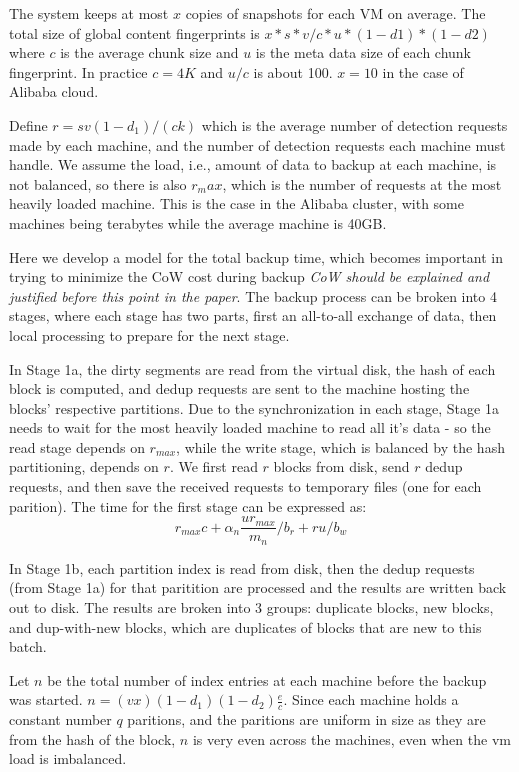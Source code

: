 The system keeps at most  $ x$ copies of snapshots for each VM on average.  The
total size of  global content fingerprints is $x*s*v/c*u *(1-d1)*(1-d2)$ where
$c$ is the average chunk size and $u$ is the meta data size of each chunk
fingerprint. In practice $c=4K$ and $u/c$  is about 100.  $x=10$ in the case of
Alibaba cloud.

Define $r = s v (1-d_1)/(ck)$  which is the average number of detection
requests made by each machine, and the number of detection requests each
machine must handle.  We assume the load, i.e., amount of data to backup at
each machine, is not balanced, so there is also $r_max$, which is the number of
requests at the most heavily loaded machine. This is the case in the Alibaba
cluster, with some machines being terabytes while the average machine is 40GB.

Here we develop a model for the total backup time, which becomes important in
trying to minimize the CoW cost during backup \emph{CoW should be explained and
justified before this point in the paper}.  The backup process can be broken
into 4 stages, where each stage has two parts, first an all-to-all exchange of
data, then local processing to prepare for the next stage.

In Stage 1a, the dirty segments are read from the virtual disk, the hash of
each block is computed, and dedup requests are sent to the machine hosting the
blocks' respective partitions. Due to the synchronization in each stage, Stage
1a needs to wait for the most heavily loaded machine to read all it's data - so
the read stage depends on $r_{max}$, while the write stage, which is balanced
by the hash partitioning, depends on $r$. We first read $r$ blocks from disk,
send $r$ dedup requests, and then save the received requests to temporary files
(one for each parition). The time for the first stage can be expressed as:
\[
    r_{max} c + \alpha_n\frac{u r_{max}}{m_n} / b_r + r u / b_w
\]

In Stage 1b, each partition index is read from disk, then the dedup requests
(from Stage 1a) for that paritition are processed and the results are written
back out to disk. The results are broken into 3 groups: duplicate blocks, new
blocks, and dup-with-new blocks, which are duplicates of blocks that are new to
this batch.

Let $n$ be the total number of index entries at each machine before the backup
was started.  $n=(v x)(1-d_1)(1-d_2)\frac{e}{c}$. Since each machine holds a
constant number $q$ paritions, and the paritions are uniform in size as they
are from the hash of the block, $n$ is very even across the machines, even when
the vm load is imbalanced.

